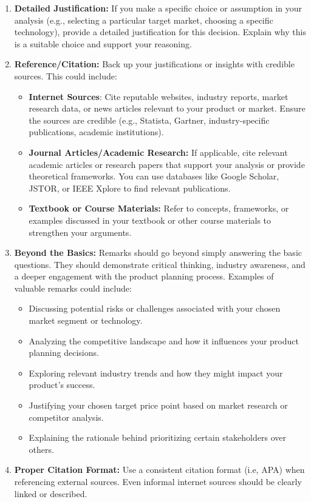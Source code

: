 \begin{enumerate}
\item \textbf{Detailed Justification:} If you make a specific choice or assumption in your analysis (e.g., selecting a particular target market, choosing a specific technology), provide a detailed justification for this decision. Explain why this is a suitable choice and support your reasoning.
\item \textbf{Reference/Citation:} Back up your justifications or insights with credible sources. This could include:
\begin{itemize}
\item \textbf{Internet Sources}: Cite reputable websites, industry reports, market research data, or news articles relevant to your product or market. Ensure the sources are credible (e.g., Statista, Gartner, industry-specific publications, academic institutions).
\item \textbf{Journal Articles/Academic Research:} If applicable, cite relevant academic articles or research papers that support your analysis or provide theoretical frameworks. You can use databases like Google Scholar, JSTOR, or IEEE Xplore to find relevant publications.
\item \textbf{Textbook or Course Materials:} Refer to concepts, frameworks, or examples discussed in your textbook or other course materials to strengthen your arguments.
\end{itemize}
\item \textbf{Beyond the Basics:} Remarks should go beyond simply answering the basic questions. They should demonstrate critical thinking, industry awareness, and a deeper engagement with the product planning process. Examples of valuable remarks could include:
\begin{itemize}
\item Discussing potential risks or challenges associated with your chosen market segment or technology.
\item Analyzing the competitive landscape and how it influences your product planning decisions.
\item Exploring relevant industry trends and how they might impact your product's success.
\item Justifying your chosen target price point based on market research or competitor analysis.
\item Explaining the rationale behind prioritizing certain stakeholders over others.
\end{itemize}
\item \textbf{Proper Citation Format:} Use a consistent citation format (i.e, APA) when referencing external sources. Even informal internet sources should be clearly linked or described.
\end{enumerate}

